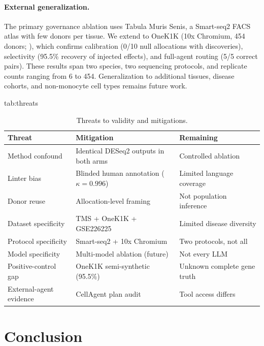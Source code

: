 \documentclass[pmlr,twocolumn,10pt]{jmlr}
\begin{document}
\paragraph{External generalization.} The primary governance ablation uses
Tabula Muris Senis, a Smart-seq2 FACS atlas with few donors per tissue. We
extend to OneK1K (10x Chromium, 454 donors; ), which
confirms calibration (0/10 null allocations with discoveries), selectivity
(95.5\% recovery of injected effects), and full-agent routing (5/5 correct
pairs). These results span two species, two sequencing protocols, and
replicate counts ranging from 6 to 454. Generalization to additional
tissues, disease cohorts, and non-monocyte cell types remains future work.

\begin{table}[htbp]
\floatconts
  {tab:threats}
  {\caption{Threats to validity and mitigations.}}
  {\footnotesize
  \begin{tabular}{@{}p{2.1cm}p{2.5cm}p{2.5cm}@{}}
  \toprule
  \textbf{Threat} & \textbf{Mitigation} & \textbf{Remaining} \\
  \midrule
  Method confound & Identical DESeq2 outputs in both arms & Controlled ablation \\
  Linter bias & Blinded human annotation ($\kappa{=}0.996$) & Limited language coverage \\
  Donor reuse & Allocation-level framing & Not population inference \\
  Dataset specificity & TMS + OneK1K + GSE226225 & Limited disease diversity \\
  Protocol specificity & Smart-seq2 + 10x Chromium & Two protocols, not all \\
  Model specificity & Multi-model ablation (future) & Not every LLM \\
  Positive-control gap & OneK1K semi-synthetic (95.5\%) & Unknown complete gene truth \\
  External-agent evidence & CellAgent plan audit & Tool access differs \\
  \bottomrule
  \end{tabular}}
\end{table}

\section{Conclusion}
\end{document}
